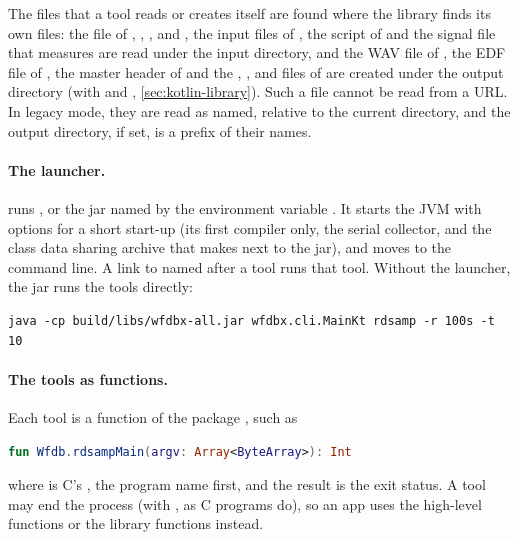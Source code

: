 The files that a tool reads or creates itself are found where the library finds its own
files: the  file of , , ,  and
, the input files of , the  script of  and
the signal file that  measures are read under the input directory, and the
WAV file of , the EDF file of , the master header of
 and the , ,  and  files of
 are created under the output directory (with
 and , \cref{sec:kotlin-library}). Such
a file cannot be read from a URL. In legacy mode, they are read as named, relative to the
current directory, and the output directory, if set, is a prefix of their names.

\paragraph{The launcher.}  runs , or the jar named by the environment variable
. It starts the JVM with options for a short start-up (its first
compiler only, the serial collector, and the class data sharing archive
 that  makes next to the jar), and moves
 to the command line. A link to  named after a
tool runs that tool. Without the launcher, the jar runs the tools directly:

\begin{lstlisting}[style=shell]
java -cp build/libs/wfdbx-all.jar wfdbx.cli.MainKt rdsamp -r 100s -t 10
\end{lstlisting}

\paragraph{The tools as functions.} Each tool is a function of the package
, such as
\begin{lstlisting}[language=Kotlin]
fun Wfdb.rdsampMain(argv: Array<ByteArray>): Int
\end{lstlisting}
where  is C's , the program name first, and the result is the exit
status. A tool may end the process (with
, as C programs do), so an app uses the high-level functions or the library
functions instead.

